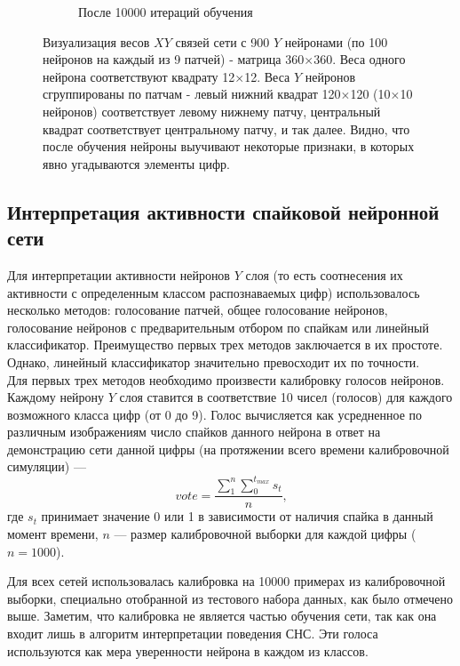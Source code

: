 \documentclass[a4paper]{article}
\begin{document}
\begin{figure}
\begin{subfigure}{0.45\textwidth}
    \caption{После 10000 итераций обучения}
\end{subfigure}
\caption{Визуализация весов $XY$ связей сети с 900 $Y$ нейронами (по 100 нейронов на каждый из 9 патчей) - матрица 360$\times$360. Веса одного нейрона соответствуют квадрату 12$\times$12. Веса $Y$ нейронов сгруппированы по патчам - левый нижний квадрат 120$\times$120 (10$\times$10 нейронов) соответствует левому нижнему патчу, центральный квадрат соответствует центральному патчу, и так далее. Видно, что после обучения нейроны выучивают некоторые признаки, в которых явно угадываются элементы цифр.}
\end{figure}

\subsection{Интерпретация активности спайковой нейронной сети}

Для интерпретации активности нейронов $Y$ слоя (то есть соотнесения их активности с определенным классом распознаваемых цифр) использовалось несколько методов: голосование патчей, общее голосование нейронов, голосование нейронов с предварительным отбором по спайкам или линейный классификатор. Преимущество первых трех методов заключается в их простоте. Однако, линейный классификатор значительно превосходит их по точности.\\

Для первых трех методов необходимо произвести калибровку голосов нейронов. Каждому нейрону $Y$ слоя ставится в соответствие 10 чисел (голосов) для каждого возможного класса цифр (от 0 до 9). Голос вычисляется как усредненное по различным изображениям число спайков данного нейрона в ответ на демонстрацию сети данной цифры (на протяжении всего времени калибровочной симуляции) ---
$$vote = \frac{\sum_{1}^{n} {\sum_{0}^{t_{max}} s_t}}{n} \text{,}$$
где $s_t$ принимает значение 0 или 1 в зависимости от наличия спайка в данный момент времени, $n$ --- размер калибровочной выборки для каждой цифры ($n = 1000$).

Для всех сетей использовалась калибровка на 10000 примерах из калибровочной выборки, специально отобранной из тестового набора данных, как было отмечено выше. Заметим, что калибровка не является частью обучения сети, так как она входит лишь в алгоритм интерпретации поведения СНС. Эти голоса используются как мера уверенности нейрона в каждом из классов.
\end{document}
